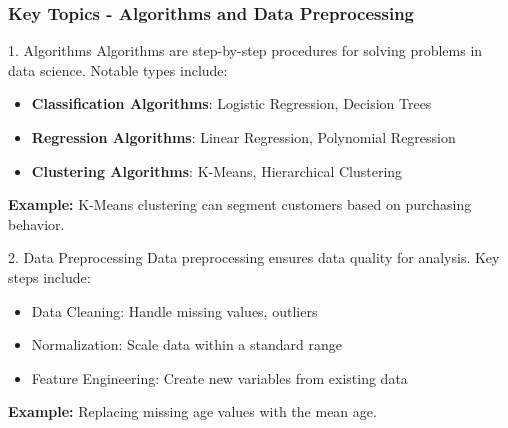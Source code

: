 \documentclass[aspectratio=169]{beamer}
\begin{document}
\begin{frame}[fragile]
    \frametitle{Key Topics - Algorithms and Data Preprocessing}
    \begin{block}{1. Algorithms}
        Algorithms are step-by-step procedures for solving problems in data science. Notable types include:
        \begin{itemize}
            \item \textbf{Classification Algorithms}: Logistic Regression, Decision Trees
            \item \textbf{Regression Algorithms}: Linear Regression, Polynomial Regression
            \item \textbf{Clustering Algorithms}: K-Means, Hierarchical Clustering
        \end{itemize}
        \textbf{Example:} K-Means clustering can segment customers based on purchasing behavior.
    \end{block}
    
    \begin{block}{2. Data Preprocessing}
        Data preprocessing ensures data quality for analysis. Key steps include:
        \begin{itemize}
            \item Data Cleaning: Handle missing values, outliers
            \item Normalization: Scale data within a standard range
            \item Feature Engineering: Create new variables from existing data
        \end{itemize}
        \textbf{Example:} Replacing missing age values with the mean age.
    \end{block}
\end{frame}
\end{document}
